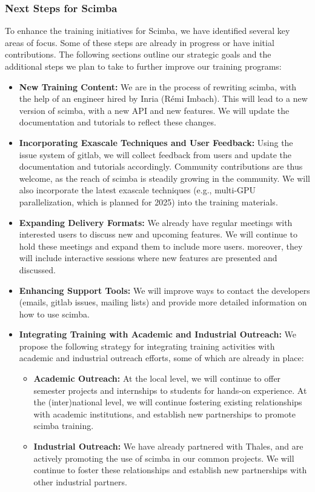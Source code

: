 \subsubsection{Next Steps for Scimba}
\label{sec:Scimba:next-steps}

To enhance the training initiatives for Scimba, we have identified several key areas of focus. Some of these steps are already in progress or have initial contributions. The following sections outline our strategic goals and the additional steps we plan to take to further improve our training programs:
\begin{itemize}
    \item \textbf{New Training Content:}
          We are in the process of rewriting scimba, with the help of an engineer hired by Inria (Rémi Imbach). This will lead to a new version of scimba, with a new API and new features. We will update the documentation and tutorials to reflect these changes.
    \item \textbf{Incorporating Exascale Techniques and User Feedback:}
          Using the issue system of gitlab, we will collect feedback from users and update the documentation and tutorials accordingly.
          Community contributions are thus welcome, as the reach of scimba is steadily growing in the community.
          We will also incorporate the latest exascale techniques (e.g., multi-GPU parallelization, which is planned for 2025) into the training materials.
    \item \textbf{Expanding Delivery Formats:}
          We already have regular meetings with interested users to discuss new and upcoming features. We will continue to hold these meetings and expand them to include more users.
          moreover, they will include interactive sessions where new features are presented and discussed.
    \item \textbf{Enhancing Support Tools:}
          We will improve ways to contact the developers (emails, gitlab issues, mailing lists) and provide more detailed information on how to use scimba.
    \item \textbf{Integrating Training with Academic and Industrial Outreach:}
          We propose the following strategy for integrating training activities with academic and industrial outreach efforts, some of which are already in place:
          \begin{itemize}
              \item \textbf{Academic Outreach:}
                    At the local level, we will continue to offer semester projects and internships to students for hands-on experience.
                    At the (inter)national level, we will continue fostering existing relationships with academic institutions, and establish new partnerships to promote scimba training.
              \item \textbf{Industrial Outreach:}
                    We have already partnered with Thales, and are actively promoting the use of scimba in our common projects. We will continue to foster these relationships and establish new partnerships with other industrial partners.
          \end{itemize}
\end{itemize}
